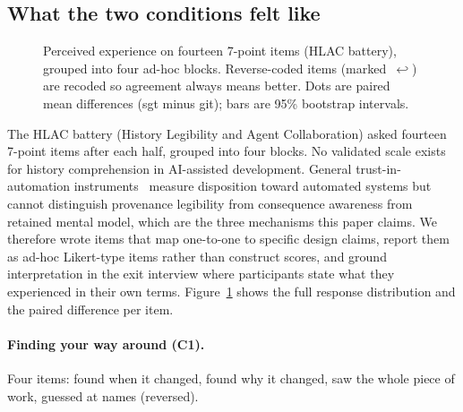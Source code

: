\subsection{What the two conditions felt like}
\label{sec:findings-perception}

\begin{figure}[t]
  \centering
  \caption{Perceived experience on fourteen 7-point items (HLAC battery),
  grouped into four ad-hoc blocks. Reverse-coded items (marked~$\hookleftarrow$)
  are recoded so agreement always means better. Dots are paired mean differences
  (sgt minus git); bars are 95\% bootstrap intervals.}
  \label{fig:perception}
\end{figure}

The HLAC battery (History Legibility and Agent Collaboration) asked fourteen
7-point items after each half, grouped into four blocks.
No validated scale exists for history comprehension in AI-assisted development.
General trust-in-automation instruments~\cite{jian2000} measure disposition
toward automated systems but cannot distinguish provenance legibility from
consequence awareness from retained mental model, which are the three mechanisms
this paper claims.  We therefore wrote items that map one-to-one to specific
design claims, report them as ad-hoc Likert-type items rather than construct
scores, and ground interpretation in the exit interview where participants state
what they experienced in their own terms.
Figure~\ref{fig:perception} shows the full response distribution
and the paired difference per item.

\paragraph{Finding your way around (C1).}
Four items: found when it changed, found why it changed, saw the whole piece of
work, guessed at names (reversed).

